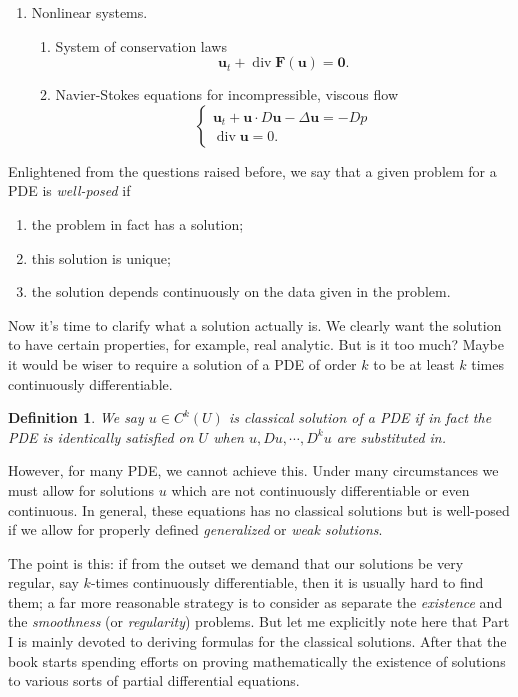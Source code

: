 \documentclass[hyperref,UTF8,12pt]{article}
\numberwithin{equation}{subsection}
\theoremstyle{plain}
\newtheorem{definition}{Definition}
\theoremstyle{definition}
\numberwithin{theorem}{section}
\numberwithin{lemma}{section}
\numberwithin{proposition}{section}
\numberwithin{remark}{section}
\numberwithin{corollary}{section}
\numberwithin{definition}{section}
\numberwithin{problem}{section}
\numberwithin{example}{section}
\newcommand{\divv}{\operatorname{div}}
\begin{document}
\begin{enumerate}
\begin{enumerate}
\begin{enumerate}
		\end{enumerate}
		\item Nonlinear systems.
		\begin{enumerate}
			\item System of conservation laws
			\[\mathbf{u}_t+\divv\mathbf{F}(\mathbf{u})=\mathbf{0}.\]
			\item Navier-Stokes equations for incompressible, viscous flow\[\begin{cases}
			\mathbf{u}_t+\mathbf{u}\cdot D\mathbf{u}-\Delta\mathbf{u}=-Dp\\
			\divv\mathbf{u}=0.
			\end{cases}\]
		\end{enumerate}
	\end{enumerate}
\end{enumerate}
Enlightened from the questions raised before, we say that a given problem for a PDE is \emph{well-posed} if
\begin{enumerate}
	\item the problem in fact has a solution;
	\item this solution is unique;
	\item the solution depends continuously on the data given in the problem.
\end{enumerate}
Now it's time to clarify what a solution actually is. We clearly want the solution to have certain properties, for example, real analytic. But is it too much? Maybe it would be wiser to require a solution of a PDE of order $k$ to be at least $k$ times continuously differentiable.
\begin{definition}
We say $u \in C^k(U)$ is \emph{classical solution} of a PDE if in fact the PDE is identically satisfied on $U$ when $u,Du,\cdots,D^k u$ are substituted in.
\end{definition}
However, for many PDE, we cannot achieve this. Under many circumstances we must allow for solutions $u$ which are not continuously differentiable or even continuous. In general, these equations has no classical solutions but is well-posed if we allow for properly defined \emph{generalized} or \emph{weak solutions}.

The point is this: if from the outset we demand that our solutions be very regular, say $k$-times continuously differentiable, then it is usually hard to find them; a far more reasonable strategy is to consider as separate the \emph{existence} and the \emph{smoothness} (or \emph{regularity}) problems. But let me explicitly note here that Part I is mainly devoted to deriving formulas for the classical solutions. After that the book starts spending efforts on proving mathematically the existence of solutions to various sorts of partial differential equations.
\end{document}

